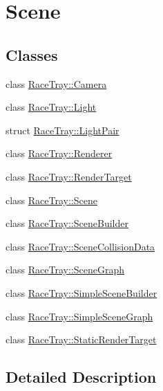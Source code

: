 \hypertarget{group___scene}{\section{Scene}
\label{group___scene}
}
\subsection*{Classes}
\begin{DoxyCompactItemize}
\item 
class \hyperlink{class_race_tray_1_1_camera}{Race\-Tray\-::\-Camera}
\item 
class \hyperlink{class_race_tray_1_1_light}{Race\-Tray\-::\-Light}
\item 
struct \hyperlink{struct_race_tray_1_1_light_pair}{Race\-Tray\-::\-Light\-Pair}
\item 
class \hyperlink{class_race_tray_1_1_renderer}{Race\-Tray\-::\-Renderer}
\item 
class \hyperlink{class_race_tray_1_1_render_target}{Race\-Tray\-::\-Render\-Target}
\item 
class \hyperlink{class_race_tray_1_1_scene}{Race\-Tray\-::\-Scene}
\item 
class \hyperlink{class_race_tray_1_1_scene_builder}{Race\-Tray\-::\-Scene\-Builder}
\item 
class \hyperlink{class_race_tray_1_1_scene_collision_data}{Race\-Tray\-::\-Scene\-Collision\-Data}
\item 
class \hyperlink{class_race_tray_1_1_scene_graph}{Race\-Tray\-::\-Scene\-Graph}
\item 
class \hyperlink{class_race_tray_1_1_simple_scene_builder}{Race\-Tray\-::\-Simple\-Scene\-Builder}
\item 
class \hyperlink{class_race_tray_1_1_simple_scene_graph}{Race\-Tray\-::\-Simple\-Scene\-Graph}
\item 
class \hyperlink{class_race_tray_1_1_static_render_target}{Race\-Tray\-::\-Static\-Render\-Target}
\end{DoxyCompactItemize}


\subsection{Detailed Description}
